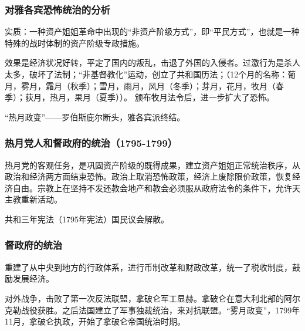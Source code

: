 \subsubsection{对雅各宾恐怖统治的分析}
实质：一种资产姐姐革命中出现的“非资产阶级方式”，即“平民方式”，也就是一种特殊的战时体制的资产阶级专政措施。

效果是经济状况好转，平定了国内的叛乱，击退了外国的入侵者。过激行为是杀人太多，破坏了法制；“非基督教化”运动，创立了共和国历法；（12个月的名称：葡月，雾月，霜月（秋季）；雪月，雨月，风月（冬季）；芽月，花月，牧月（春季）；荻月，热月，果月（夏季））。
颁布牧月法令后，进一步扩大了恐怖。

“热月政变”——罗伯斯庇尔断头，雅各宾派终结。

\subsubsection{热月党人和督政府的统治（1795-1799）}
热月党的客观任务，是巩固资产阶级的既得成果，建立资产姐姐正常统治秩序，从政治和经济两方面结束恐怖。政治上取消恐怖政策，经济上废除限价政策，恢复经济自由。宗教上在坚持不发还教会地产和教会必须服从政府法令的条件下，允许天主教重新活动。

共和三年宪法（1795年宪法）国民议会解散。

\subsubsection{督政府的统治}
重建了从中央到地方的行政体系，进行币制改革和财政改革，统一了税收制度，鼓励发展经济。

对外战争，击败了第一次反法联盟，拿破仑军工显赫。拿破仑在意大利北部的阿尔克勒战役获胜。之后法国建立了军事独裁统治，来对抗联盟。“雾月政变”，1799年11月，拿破仑执政，开始了拿破仑帝国统治时期。



